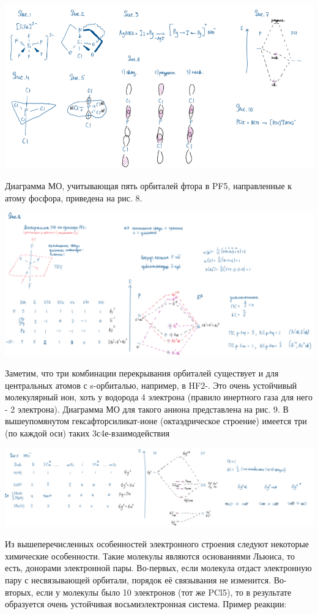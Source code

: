 \documentclass[14pt,a4paper]{scrartcl}
\begin{document}
\includegraphics{15v1.png}

Диаграмма МО, учитывающая пять орбиталей фтора в PF5, направленные к атому фосфора, приведена на рис. 8.

\includegraphics[scale=0.8]{15v2.png}


Заметим, что три комбинации перекрывания орбиталей существует и для центральных атомов с s-орбиталью, например, в HF2-. Это очень устойчивый молекулярный ион, хоть у водорода 4
электрона (правило инертного газа для него - 2 электрона). Диаграмма МО для такого аниона представлена на рис. 9. В вышеупомянутом гексафторсиликат-ионе (октаэдрическое строение)
имеется три (по каждой оси) таких 3с4е-взаимодействия

\includegraphics[scale=0.75]{15v3.png}

Из вышеперечисленных особенностей электронного строения следуют некоторые химические особенности. Такие молекулы являются основаниями Льюиса, то есть, донорами электронной
пары. Во-первых, если молекула отдаст электронную пару с несвязывающей орбитали, порядок её связывания не изменится. Во-вторых, если у молекулы было 10 электронов (тот же PCl5),
то в результате образуется очень устойчивая восьмиэлектронная система. Пример реакции:
\end{document}
